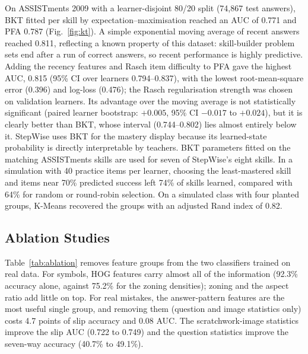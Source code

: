 \documentclass[runningheads]{llncs}
\begin{document}
On ASSISTments 2009 with a learner-disjoint 80/20 split (74,867 test answers), BKT fitted per skill by expectation--maximisation reached an AUC of 0.771 and PFA 0.787 (Fig.~\ref{fig:kt}). A simple exponential moving average of recent answers reached 0.811, reflecting a known property of this dataset: skill-builder problem sets end after a run of correct answers, so recent performance is highly predictive. Adding the recency features and Rasch item difficulty to PFA gave the highest AUC, 0.815 (95\% CI over learners 0.794--0.837), with the lowest root-mean-square error (0.396) and log-loss (0.476); the Rasch regularisation strength was chosen on validation learners. Its advantage over the moving average is not statistically significant (paired learner bootstrap: $+0.005$, 95\% CI $-0.017$ to $+0.024$), but it is clearly better than BKT, whose interval (0.744--0.802) lies almost entirely below it. StepWise uses BKT for the mastery display because its learned-state probability is directly interpretable by teachers. BKT parameters fitted on the matching ASSISTments skills are used for seven of StepWise's eight skills. In a simulation with 40 practice items per learner, choosing the least-mastered skill and items near 70\% predicted success left 74\% of skills learned, compared with 64\% for random or round-robin selection. On a simulated class with four planted groups, K-Means recovered the groups with an adjusted Rand index of 0.82.

\subsection{Ablation Studies}

Table~\ref{tab:ablation} removes feature groups from the two classifiers trained on real data. For symbols, HOG features carry almost all of the information (92.3\% accuracy alone, against 75.2\% for the zoning densities); zoning and the aspect ratio add little on top. For real mistakes, the answer-pattern features are the most useful single group, and removing them (question and image statistics only) costs 4.7 points of slip accuracy and 0.08 AUC. The scratchwork-image statistics improve the slip AUC (0.722 to 0.749) and the question statistics improve the seven-way accuracy (40.7\% to 49.1\%).
\end{document}

